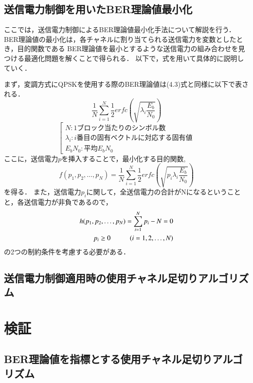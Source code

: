 \subsection{送信電力制御を用いたBER理論値最小化}
ここでは，送信電力制御によるBER理論値最小化手法について解説を行う．
BER理論値の最小化は，各チャネルに割り当てられる送信電力を変数としたとき，目的関数である
BER理論値を最小とするような送信電力の組み合わせを見つける最適化問題を解くことで得られる．
以下で，式を用いて具体的に説明していく．

まず，変調方式にQPSKを使用する際のBER理論値は(4.3)式と同様に以下で表される．
\begin{equation}
    \frac{1}{N} \sum_{i=1}^N \frac{1}{2}erfc\left( \sqrt{\lambda_i\frac{E_b}{N_0}} \right)
\end{equation}
\begin{equation}
    \left[
        \begin{array}{l}
            N:1ブロック当たりのシンボル数 \\
            \lambda_i:i番目の固有ベクトルに対応する固有値 \\
            E_bN_0:平均E_bN_0
        \end{array}
    \right. \nonumber
\end{equation}
ここに，送信電力$p$を挿入することで，最小化する目的関数,
\begin{equation}
    f(p_1,p_2,\ldots,p_N) = \frac{1}{N} \sum_{i=1}^N \frac{1}{2}erfc\left( \sqrt{p_i\lambda_i\frac{E_b}{N_0}} \right)
\end{equation}
を得る．
また，送信電力$p_i$に関して，全送信電力の合計がNになるということと，各送信電力が非負であるので，
\begin{eqnarray}
    h(p_1,p_2,\ldots,p_N) = \sum_{i=1}^N p_i-N=0 \\
    p_i \geq 0 \hspace{10mm} (i=1,2,\ldots,N)
\end{eqnarray}
の2つの制約条件を考慮する必要がある．

\subsection{送信電力制御適用時の使用チャネル足切りアルゴリズム}

\section{検証}
\subsection{BER理論値を指標とする使用チャネル足切りアルゴリズム}
